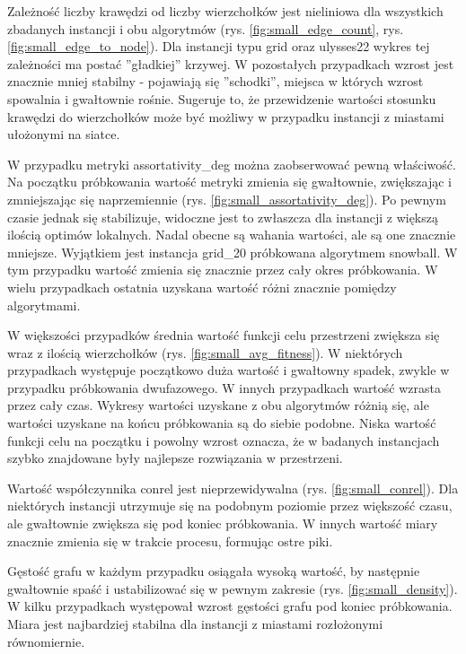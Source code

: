 Zależność liczby krawędzi od liczby wierzchołków jest nieliniowa dla wszystkich zbadanych instancji i obu algorytmów (rys. \ref{fig:small_edge_count}, rys. \ref{fig:small_edge_to_node}).
Dla instancji typu grid oraz ulysses22 wykres tej zależności ma postać ''gładkiej'' krzywej.
W pozostałych przypadkach wzrost jest znacznie mniej stabilny - pojawiają się ''schodki'', miejsca w których wzrost
spowalnia i gwałtownie rośnie.
Sugeruje to, że przewidzenie wartości stosunku krawędzi do wierzchołków może być możliwy w przypadku
instancji z miastami ułożonymi na siatce.

W przypadku metryki assortativity\_deg można zaobserwować pewną właściwość.
Na początku próbkowania wartość metryki zmienia się gwałtownie, zwiększając i zmniejszając się naprzemiennie (rys. \ref{fig:small_assortativity_deg}).
Po pewnym czasie jednak się stabilizuje, widoczne jest to zwłaszcza dla instancji z większą ilością optimów lokalnych.
Nadal obecne są wahania wartości, ale są one znacznie mniejsze.
Wyjątkiem jest instancja grid\_20 próbkowana algorytmem snowball.
W tym przypadku wartość zmienia się znacznie przez cały okres próbkowania.
W wielu przypadkach ostatnia uzyskana wartość różni znacznie pomiędzy algorytmami.

W większości przypadków średnia wartość funkcji celu przestrzeni zwiększa się wraz z ilością wierzchołków (rys. \ref{fig:small_avg_fitness}).
W niektórych przypadkach występuje początkowo duża wartość i gwałtowny spadek, zwykle w przypadku próbkowania dwufazowego.
W innych przypadkach wartość wzrasta przez cały czas.
Wykresy wartości uzyskane z obu algorytmów różnią się, ale wartości uzyskane na końcu próbkowania są do siebie podobne.
Niska wartość funkcji celu na początku i powolny wzrost oznacza, że w badanych instancjach szybko znajdowane były
najlepsze rozwiązania w przestrzeni.

Wartość współczynnika conrel jest nieprzewidywalna (rys. \ref{fig:small_conrel}).
Dla niektórych instancji utrzymuje się na podobnym poziomie przez większość czasu,
ale gwałtownie zwiększa się pod koniec próbkowania.
W innych wartość miary znacznie zmienia się w trakcie procesu, formując ostre piki.

Gęstość grafu w każdym przypadku osiągała wysoką wartość, by następnie gwałtownie spaść i ustabilizować się w pewnym zakresie (rys. \ref{fig:small_density}).
W kilku przypadkach występował wzrost gęstości grafu pod koniec próbkowania.
Miara jest najbardziej stabilna dla instancji z miastami rozłożonymi równomiernie.

